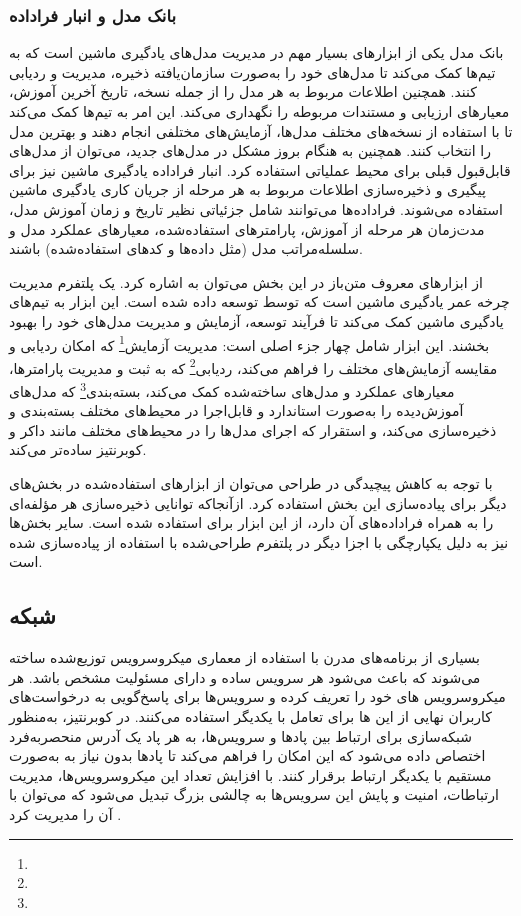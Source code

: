 \subsubsection{بانک مدل و انبار فراداده}
بانک مدل یکی از ابزارهای بسیار مهم در مدیریت مدل‌های یادگیری ماشین است که به تیم‌ها کمک می‌کند تا مدل‌های خود را به‌صورت سازمان‌یافته ذخیره، مدیریت و ردیابی کنند. همچنین اطلاعات مربوط به هر مدل را از جمله نسخه، تاریخ آخرین آموزش، معیارهای ارزیابی و مستندات مربوطه را نگهداری می‌کند. این امر به تیم‌ها کمک می‌کند تا با استفاده از نسخه‌های مختلف مدل‌ها، آزمایش‌های مختلفی انجام دهند و بهترین مدل را انتخاب کنند. همچنین به هنگام بروز مشکل در مدل‌های جدید، می‌توان از مدل‌های قابل‌قبول قبلی برای محیط عملیاتی استفاده کرد. انبار فراداده یادگیری ماشین نیز برای پیگیری و ذخیره‌سازی اطلاعات مربوط به هر مرحله از جریان کاری یادگیری ماشین استفاده می‌شوند. فراداده‌ها می‌توانند شامل جزئیاتی نظیر تاریخ و زمان آموزش مدل، مدت‌زمان هر مرحله از آموزش، پارامترهای استفاده‌شده، معیارهای عملکرد مدل و سلسله‌مراتب مدل (مثل داده‌ها و کدهای استفاده‌شده) باشند.

از ابزارهای معروف متن‌باز در این بخش می‌توان به  اشاره کرد.  یک پلتفرم مدیریت چرخه عمر یادگیری ماشین است که توسط  توسعه داده شده است. این ابزار به تیم‌های یادگیری ماشین کمک می‌کند تا فرآیند توسعه، آزمایش و مدیریت مدل‌های خود را بهبود بخشند. این ابزار شامل چهار جزء اصلی است: مدیریت آزمایش\footnote{} که امکان ردیابی و مقایسه آزمایش‌های مختلف را فراهم می‌کند، ردیابی\footnote{} که به ثبت و مدیریت پارامترها، معیارهای عملکرد و مدل‌های ساخته‌شده کمک می‌کند، بسته‌بندی\footnote{} که مدل‌های آموزش‌دیده را به‌صورت استاندارد و قابل‌اجرا در محیط‌های مختلف بسته‌بندی و ذخیره‌سازی می‌کند، و استقرار که اجرای مدل‌ها را در محیط‌های مختلف مانند داکر و کوبرنتیز ساده‌تر می‌کند.

با توجه به کاهش پیچیدگی در طراحی می‌توان از ابزارهای استفاده‌شده در بخش‌های دیگر برای پیاده‌سازی این بخش استفاده کرد. ازآنجاکه  توانایی ذخیره‌سازی هر مؤلفه‌ای را به همراه فراداده‌های آن دارد، از این ابزار برای  استفاده شده است. سایر بخش‌ها نیز به دلیل یکپارچگی با اجزا دیگر در پلتفرم طراحی‌شده با استفاده از  پیاده‌سازی شده است.

\subsection{شبکه}
بسیاری از برنامه‌های مدرن با استفاده از معماری میکروسرویس توزیع‌شده ساخته می‌شوند که باعث می‌شود هر سرویس ساده و دارای مسئولیت مشخص باشد. هر میکروسرویس های خود را تعریف کرده و سرویس‌ها برای پاسخ‌گویی به درخواست‌های کاربران نهایی از این ها برای تعامل با یکدیگر استفاده می‌کنند. در کوبرنتیز، به‌منظور شبکه‌سازی برای ارتباط بین پادها و سرویس‌ها، به هر پاد یک آدرس  منحصربه‌فرد اختصاص داده می‌شود که این امکان را فراهم می‌کند تا پادها بدون نیاز به  به‌صورت مستقیم با یکدیگر ارتباط برقرار کنند. با افزایش تعداد این میکروسرویس‌ها، مدیریت ارتباطات، امنیت و پایش این سرویس‌ها به چالشی بزرگ تبدیل می‌شود که می‌توان با  آن را مدیریت کرد \cite{Istio1}.

